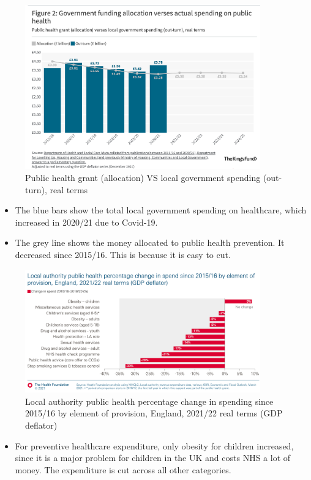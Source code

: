         \begin{figure}[H]%
                \centering
                \includegraphics[width=4in]{images/ch3/20.png}
                \caption{Public health grant (allocation) VS local government spending (out-turn), real terms}
                \label{fig:label}
            \end{figure}
\begin{itemize}           
        \item The blue bars show the total local government spending on healthcare, which increased in 2020/21 due to Covid-19.
        \item The grey line shows the money allocated to public health prevention. It decreased since 2015/16. This is because it is easy to cut. 
        \end{itemize} 
        
        \begin{figure}[H]%
                \centering
                \includegraphics[width=4in]{images/ch3/21.png}
                \caption{Local authority public health percentage change in spending since 2015/16 by element of provision, England, 2021/22 real terms (GDP deflator)}
                \label{fig:label}
            \end{figure}
\begin{itemize}           
        \item For preventive healthcare expenditure, only obesity for children increased, since it is a major problem for children in the UK and costs NHS a lot of money. The expenditure is cut across all other categories.
        \end{itemize} 

